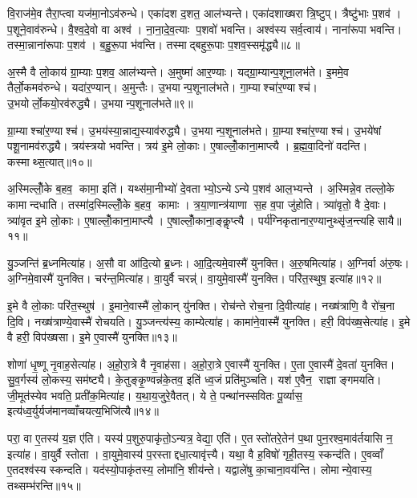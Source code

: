 वि॒राज॑मे॒व तैरा॒प्त्वा यज॑मा॒नोऽव॑रुन्धे। एका॑दश द॒शत॒ आल॑भ्यन्ते। एका॑दशाख्षरा त्रि॒ष्टुप्। त्रैष्टु॑भाः प॒शव॑। प॒शूने॒वाव॑रुन्धे। वै॒श्व॒दे॒वो वा अश्व॑। ना॒ना॒दे॒व॒त्याः प॒शवो॑ भवन्ति। अश्व॑स्य सर्व॒त्वाय॑। नाना॑रूपा भवन्ति। तस्मा॒न्नाना॑रूपाः प॒शव॑। ब॒हु॒रू॒पा भ॑वन्ति। तस्माद्बहुरू॒पाः प॒शव॒स्समृ॑द्ध्यै॥८॥\anuvakamend[आ॒र॒ण्याल्लोँ॒को द॒शिन॑ आल॒भ्यन्ते॒ नाना॑रूपाः प॒शवो॒ द्वे च॑]

अ॒स्मै वै लो॒काय॑ ग्रा॒म्याः प॒शव॒ आल॑भ्यन्ते। अ॒मुष्मा॑ आर॒ण्याः। यद्ग्रा॒म्यान्प॒शूना॒लभ॑ते। इ॒ममे॒व तैर्लो॒कमव॑रुन्धे। यदा॑र॒ण्यान्। अ॒मुन्तैः। उ॒भयान्प॒शूनाल॑भते। गा॒म्याश्चा॑र॒ण्याश्च॑। उ॒भयोर्लो॒कयो॒रव॑रुद्ध्यै। उ॒भयान्प॒शूनाल॑भते॥९॥

ग्रा॒म्याश्चा॑र॒ण्याश्च॑। उ॒भय॑स्या॒न्नाद्य॒स्याव॑रुद्ध्यै। उ॒भयान्प॒शूनाल॑भते। ग्रा॒म्याश्चा॑र॒ण्याश्च॑। उ॒भये॑षां पशू॒नामव॑रुद्ध्यै। त्रय॑स्त्रयो भवन्ति। त्रय॑ इ॒मे लो॒काः। ए॒षाल्लोँ॒काना॒माप्त्यै। ब्र॒ह्म॒वा॒दिनो॑ वदन्ति। कस्माथ्स॒त्यात्॥१०॥

अ॒स्मिल्लोँ॒के ब॒हव॒ कामा॒ इति॑। यथ्स॑मा॒नीभ्यो॑ दे॒वताभ्यो॒ऽन्येऽन्ये प॒शव॑ आल॒भ्यन्ते। अ॒स्मिन्ने॒व तल्लो॒के कामान्दधाति। तस्मा॑द॒स्मिल्लोँ॒के ब॒हव॒ कामाः। त्र॒या॒णान्त्र॑याणा स॒ह व॒पा जु॑होति। त्र्या॑वृतो॒ वै दे॒वाः। त्र्या॑वृत इ॒मे लो॒काः। ए॒षाल्लोँ॒काना॒माप्त्यै। ए॒षाल्लोँ॒काना॒ङ्कॢप्त्यै। पर्य॑ग्निकृतानार॒ण्यानुथ्सृ॑ज॒न्त्यहिसायै॥११॥\anuvakamend[अव॑रुद्ध्या उ॒भयान्प॒शूनाल॑भते स॒त्यादहिसायै]

यु॒ञ्जन्ति॑ ब्र॒ध्नमित्या॑ह। अ॒सौ वा आ॑दि॒त्यो ब्र॒ध्नः। आ॒दि॒त्यमे॒वास्मै॑ युनक्ति। अ॒रु॒षमित्या॑ह। अ॒ग्निर्वा अ॑रु॒षः। अ॒ग्निमे॒वास्मै॑ युनक्ति। चर॑न्त॒मित्या॑ह। वा॒युर्वै चरन्न्॑। वा॒युमे॒वास्मै॑ युनक्ति। परि॑त॒स्थुष॒ इत्या॑ह॥१२॥

इ॒मे वै लो॒काः परि॑त॒स्थुष॑। इ॒माने॒वास्मै॑ लो॒कान् यु॑नक्ति। रोच॑न्ते रोच॒ना दि॒वीत्या॑ह। नख्ष॑त्राणि॒ वै रो॑च॒ना दि॒वि। नख्ष॑त्राण्ये॒वास्मै॑ रोचयति। यु॒ञ्जन्त्य॑स्य॒ काम्येत्या॑ह। कामा॑ने॒वास्मै॑ युनक्ति। हरी॒ विप॑ख्ष॒सेत्या॑ह। इ॒मे वै हरी॒ विप॑ख्षसा। इ॒मे ए॒वास्मै॑ युनक्ति॥१३॥

शोणा॑ धृ॒ष्णू नृ॒वाह॒सेत्या॑ह। अ॒हो॒रा॒त्रे वै नृ॒वाह॑सा। अ॒हो॒रा॒त्रे ए॒वास्मै॑ युनक्ति। ए॒ता ए॒वास्मै॑ दे॒वता॑ युनक्ति। सु॒व॒र्गस्य॑ लो॒कस्य॒ सम॑ष्ट्यै। के॒तुङ्कृ॒ण्वन्न॑के॒तव॒ इति॑ ध्व॒जं प्रति॑मुञ्चति। यश॑ ए॒वैन॒ राज्ञाङ्गमयति। जी॒मूत॑स्येव भवति॒ प्रती॑क॒मित्या॑ह। य॒था॒य॒जुरे॒वैतत्। ये ते॒ पन्था॑नस्सवितः पू॒र्व्यास॒ इत्य॑ध्व॒र्युर्यज॑मानव्वाँचयत्य॒भिजि॑त्यै॥१४॥

परा॒ वा ए॒तस्य॑ य॒ज्ञ ए॑ति। यस्य॑ प॒शुरु॒पाकृ॑तो॒ऽन्यत्र॒ वेद्या॒ एति॑। ए॒तस्तो॑तरे॒तेन॑ प॒था पुन॒रश्व॒माव॑र्तयासि न॒ इत्या॑ह। वा॒युर्वै स्तोता। वा॒युमे॒वास्य॑ प॒रस्ताद्दधा॒त्यावृ॑त्त्यै। यथा॒ वै ह॒विषो॑ गृही॒तस्य॒ स्कन्द॑ति। ए॒वव्वाँ ए॒तदश्व॑स्य स्कन्दति। यद॑स्यो॒पाकृ॑तस्य॒ लोमा॑नि॒ शीय॑न्ते। यद्वाले॑षु का॒चाना॒वय॑न्ति। लोमान्ये॒वास्य॒ तथ्सम्भ॑रन्ति॥१५॥

